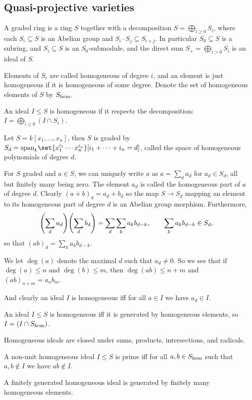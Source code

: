 \subsection{Quasi-projective varieties}

\bdefn

    A {\emphcolor graded ring} is a ring $S$ together with a decomposition $S=\bigoplus_{i\geq0}S_i$, where each $S_i\subseteq S$ is an Abelian group and $S_i\cdot S_j\subseteq S_{i+j}$.
    In particular $S_0\subseteq S$ is a subring, and $S_i\subseteq S$ is an $S_0$-submodule, and the direct sum $S_+=\bigoplus_{i>0}S_i$ is an ideal of $S$.

    Elements of $S_i$ are called {\emphcolor homogeneous of degree $i$}, and an element is just {\emphcolor homogeneous} if it is homogeneous of some degree.
    Denote the set of homogeneous elements of $S$ by $S_{\rm hom}$.

    An ideal $I\leq S$ is {\emphcolor homogeneous} if it respects the decomposition: $I=\bigoplus_{i\geq0}(I\cap S_i)$.

\edefn

\bexam

    Let $S=k[x_1,\dots,x_n]$, then $S$ is graded by $S_d=\lspan_k\set{x_1^{i_1}\cdots x_n^{i_n}}[i_1+\cdots+i_n=d]$, called the space of homogeneous polynomials of degree $d$.

\eexam

For $S$ graded and $a\in S$, we can uniquely write $a$ as $a=\sum_da_d$ for $a_d\in S_d$, all but finitely many being zero.
The element $a_d$ is called the {\emphcolor homogeneous part of $a$ of degree $d$}.
Clearly $(a+b)_d=a_d+b_d$ so the map $S\to S_d$ mapping an element to its homogeneous part of degree $d$ is an Abelian group morphism.
Furthermore,
$$ \mathopen{}\mathclose{\left(\sum_da_d\right)}\mathopen{}\mathclose{\left(\sum_db_d\right)} = \sum_d\sum_ka_kb_{d-k} , \qquad \sum_ka_kb_{d-k}\in S_d, $$
so that $(ab)_d=\sum_ka_kb_{d-k}$.

We let $\deg(a)$ denote the maximal $d$ such that $a_d\neq0$.
So we see that if $\deg(a)\leq n$ and $\deg(b)\leq m$, then $\deg(ab)\leq n+m$ and $(ab)_{n+m}=a_nb_m$.

And clearly an ideal $I$ is homogeneous iff for all $a\in I$ we have $a_d\in I$.

\blemm

    \benum
        \item An ideal $I\leq S$ is homogeneous iff it is generated by homogeneous elements, so $I=(I\cap S_{\rm hom})$.
        \item Homogeneous ideals are closed under sums, products, intersections, and radicals.
        \item A non-unit homogeneous ideal $I\leq S$ is prime iff for all $a,b\in S_{\rm hom}$ such that $a,b\notin I$ we have $ab\notin I$.
        \item A finitely generated homogeneous ideal is generated by finitely many homogeneous elements.
    \eenum

